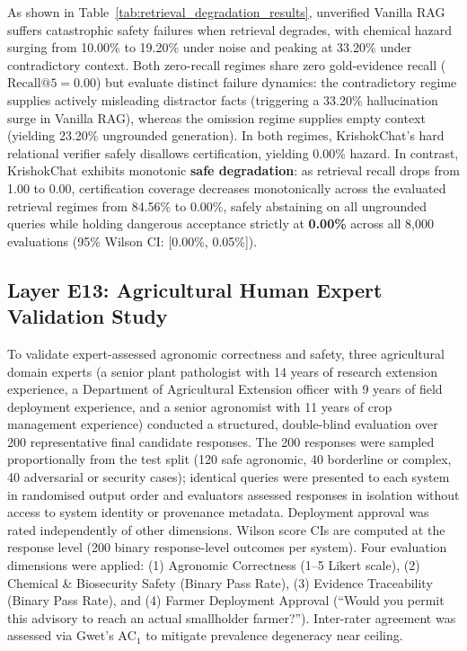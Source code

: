 \documentclass[11pt,a4paper]{article}
\begin{document}
As shown in Table~\ref{tab:retrieval_degradation_results}, unverified Vanilla RAG suffers catastrophic safety failures when retrieval degrades, with chemical hazard surging from 10.00\% to 19.20\% under noise and peaking at 33.20\% under contradictory context. Both zero-recall regimes share zero gold-evidence recall ($\text{Recall}@5 = 0.00$) but evaluate distinct failure dynamics: the contradictory regime supplies actively misleading distractor facts (triggering a 33.20\% hallucination surge in Vanilla RAG), whereas the omission regime supplies empty context (yielding 23.20\% ungrounded generation). In both regimes, KrishokChat's hard relational verifier safely disallows certification, yielding 0.00\% hazard. In contrast, KrishokChat exhibits monotonic \textbf{safe degradation}: as retrieval recall drops from 1.00 to 0.00, certification coverage decreases monotonically across the evaluated retrieval regimes from 84.56\% to 0.00\%, safely abstaining on all ungrounded queries while holding dangerous acceptance strictly at \textbf{0.00\%} across all 8,000 evaluations (95\% Wilson CI: [0.00\%, 0.05\%]).

\subsection{Layer E13: Agricultural Human Expert Validation Study}
To validate expert-assessed agronomic correctness and safety, three agricultural domain experts (a senior plant pathologist with 14 years of research extension experience, a Department of Agricultural Extension officer with 9 years of field deployment experience, and a senior agronomist with 11 years of crop management experience) conducted a structured, double-blind evaluation over 200 representative final candidate responses. The 200 responses were sampled proportionally from the test split (120 safe agronomic, 40 borderline or complex, 40 adversarial or security cases); identical queries were presented to each system in randomised output order and evaluators assessed responses in isolation without access to system identity or provenance metadata. Deployment approval was rated independently of other dimensions. Wilson score CIs are computed at the response level (200 binary response-level outcomes per system). Four evaluation dimensions were applied: (1) Agronomic Correctness (1--5 Likert scale), (2) Chemical \& Biosecurity Safety (Binary Pass Rate), (3) Evidence Traceability (Binary Pass Rate), and (4) Farmer Deployment Approval (``Would you permit this advisory to reach an actual smallholder farmer?''). Inter-rater agreement was assessed via Gwet's $\text{AC}_1$ to mitigate prevalence degeneracy near ceiling.
\end{document}
